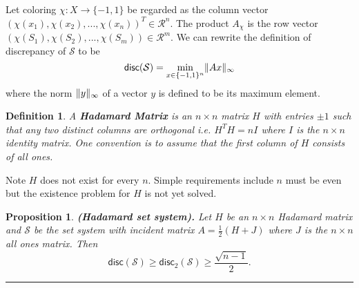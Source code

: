 \documentclass[twoside]{article}
\newtheorem{proposition}[theorem]{Proposition}
\newtheorem{definition}[theorem]{Definition}
\newenvironment{proof}{{\bf Proof:}}{\hfill\rule{2mm}{2mm}}
\newcommand\R{\mathcal{R}}
\newcommand\disc{\mathsf{disc}}
\newcommand\SSet{\mathcal{S}}
\DeclarePairedDelimiter\norm{\parallel}{\parallel}
\begin{document}
Let coloring $\chi: X \rightarrow \{-1, 1\}$ be regarded as the column vector $(\chi(x_1), \chi(x_2), ..., \chi(x_n))^T \in \R^n$. The product $A_{\chi}$ is the row vector $(\chi(S_1), \chi(S_2), ..., \chi(S_m)) \in \R^m$. We can rewrite the definition of discrepancy of $\SSet$ to be
\[\disc(\SSet) = \min_{x \in \{-1,1\}^n} \norm{Ax}_{\infty} \]
where the norm $\norm{y}_{\infty}$ of a vector $y$ is defined to be its maximum element.

\begin{definition}
A \textbf{Hadamard Matrix} is an $n\times n$ matrix $H$ with entries $\pm 1$ such that any two distinct columns are orthogonal i.e. $H^TH = nI$ where $I$ is the $n\times n$ identity matrix. One convention is to assume that the first column of $H$ consists of all ones.
\end{definition}

Note $H$ does not exist for every $n$. Simple requirements include $n$ must be even but the existence problem for $H$ is not yet solved. 

\begin{proposition}
\textbf{(Hadamard set system).} Let $H$ be an $n\times n$ Hadamard matrix and $\SSet$ be the set system with incident matrix $A = \frac{1}{2}(H + J)$ where $J$ is the $n\times n$ all ones matrix. Then 
\[\disc(\SSet) \geq \disc_2(\SSet) \geq \frac{\sqrt{n-1}}{2}.\]
\end{proposition}
\begin{proof}

\end{proof}
\end{document}
